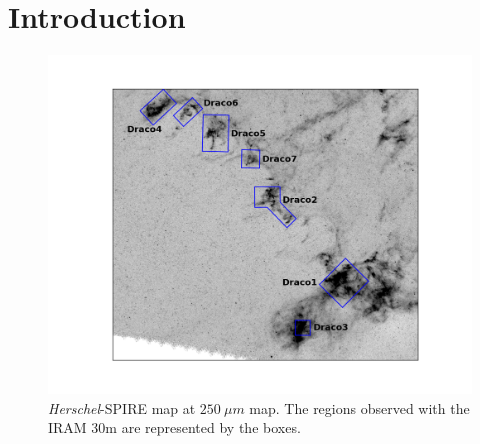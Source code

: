 \documentclass[traditabstract]{aa}
\begin{document}


\section{Introduction}

\begin{figure}[h!]
  \centering
  \includegraphics[width=0.7\linewidth,trim=165 85 135 85,clip=true]{Figures/Draco_overview.png}
  \caption{\label{overview} \emph{Herschel}-SPIRE map at $250\: \mu m$ map. The regions observed with the IRAM 30m are represented 
by the boxes.}
\end{figure}
\end{document}
